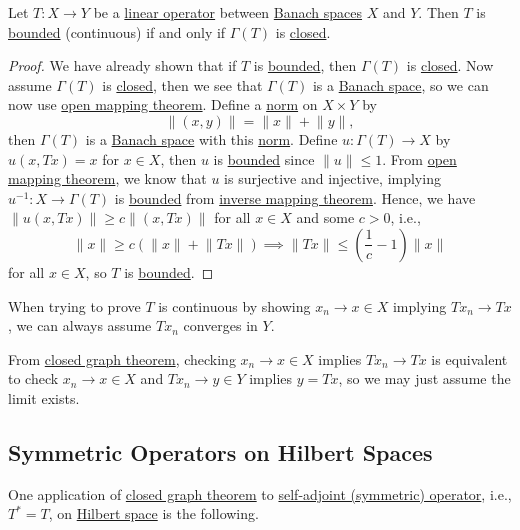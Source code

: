 \begin{theorem}\label{thm:closed-graph}
	Let \(T\colon X\to Y\) be a \hyperref[def:linear-op]{linear operator} between \hyperref[def:Banach-space]{Banach spaces} \(X\) and \(Y\). Then \(T\) is \hyperref[def:bounded-linear-op]{bounded} (continuous) if and only if \(\Gamma (T)\) is \hyperref[def:closed-graph]{closed}.
\end{theorem}
\begin{proof}
	We have already shown that if \(T\) is \hyperref[def:bounded-linear-op]{bounded}, then \(\Gamma (T)\) is \hyperref[def:closed-graph]{closed}. Now assume \(\Gamma (T)\) is \hyperref[def:closed-graph]{closed}, then we see that \(\Gamma (T)\) is a \hyperref[def:Banach-space]{Banach space}, so we can now use \hyperref[thm:open-mapping]{open mapping theorem}. Define a \hyperref[def:norm]{norm} on \(X \times Y\) by
	\[
		\lVert (x, y)\rVert = \lVert x\rVert + \lVert y\rVert,
	\]
	then \(\Gamma (T)\) is a \hyperref[def:Banach-space]{Banach space} with this \hyperref[def:norm]{norm}. Define \(u\colon \Gamma (T)\to X\) by \(u(x, Tx)=x\) for \(x\in X\), then \(u\) is \hyperref[rmk:bounded-op]{bounded} since \(\lVert u\rVert \leq 1\). From \hyperref[thm:open-mapping]{open mapping theorem}, we know that \(u\) is surjective and injective, implying \(u^{-1} \colon X\to \Gamma (T)\) is \hyperref[rmk:bounded-op]{bounded} from \hyperref[thm:inverse-mapping]{inverse mapping theorem}. Hence, we have \(\lVert u(x, Tx)\rVert \geq c \lVert (x, Tx)\rVert\) for all \(x\in X\) and some \(c> 0\), i.e.,
	\[
		\lVert x\rVert \geq c \left( \lVert x\rVert + \lVert Tx\rVert  \right) \implies \lVert Tx\rVert \leq \left( \frac{1}{c}- 1 \right) \lVert x\rVert
	\]
	for all \(x\in X\), so \(T\) is \hyperref[rmk:bounded-op]{bounded}.
\end{proof}

\begin{remark}
	When trying to prove \(T\) is continuous by showing \(x_n \to x\in X\) implying \(Tx_n \to Tx\), we can always assume \(Tx_n\) converges in \(Y\).
\end{remark}
\begin{explanation}
	From \hyperref[thm:closed-graph]{closed graph theorem}, checking \(x_n \to x\in X\) implies \(Tx_n \to Tx\) is equivalent to check \(x_n \to x\in X\) and \(Tx_n \to y\in Y\) implies \(y = Tx\), so we may just assume the limit exists.
\end{explanation}

\subsection{Symmetric Operators on Hilbert Spaces}
One application of \hyperref[thm:closed-graph]{closed graph theorem} to \hyperref[def:self-adjoint-op]{self-adjoint (symmetric) operator}, i.e., \(T^{\ast} = T\), on \hyperref[def:Hilbert-space]{Hilbert space} is the following.

